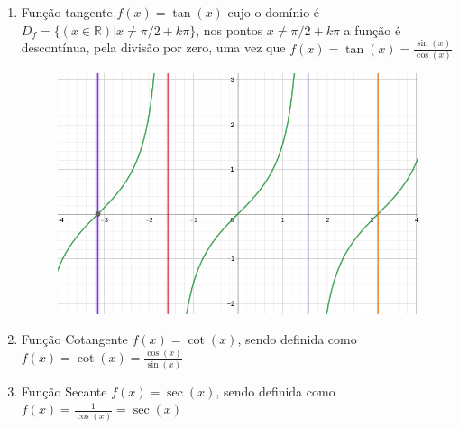 \begin{multicols*}{2}
\begin{enumerate}
    \item Função tangente $f(x) = \tan(x)$ cujo o domínio é 
    $D_f = \{(x \in \mathbb{R}) | x \ne \pi /2 + k\pi \}$, nos pontos $x \ne \pi /2 + k\pi$ a função é descontínua, pela divisão por zero, uma vez que $f(x) = \tan(x) = \frac{\sin(x)}{\cos(x)}$
    
    \begin{figure}[H]
        \includegraphics[scale=0.3]{assets/rafael/img35.png}
    \end{figure}
    
    \item Função Cotangente $f(x) = \cot(x)$, sendo definida como 
    $f(x) = \cot(x) = \frac{\cos(x)}{\sin(x)}$
    
    \item Função Secante $f(x) = \sec(x)$, sendo definida como 
    $f(x) = \frac{1}{\cos(x)} = \sec(x)$
    
    \end{enumerate}

\end{multicols*}
